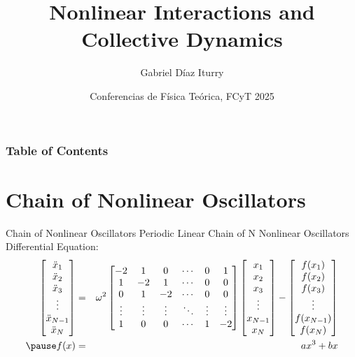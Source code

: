 \documentclass[aspectratio=169]{beamer}
\title{Nonlinear Interactions and Collective Dynamics}
\author{Gabriel D\'iaz Iturry}
\date{Conferencias de F\'isica Te\'orica, FCyT 2025}
\begin{document}
\maketitle

\begin{frame}
\frametitle{Table of Contents}
\tableofcontents
\end{frame}


\section{Chain of Nonlinear Oscillators}

\begin{frame}{Chain of Nonlinear Oscillators}
    Periodic Linear Chain of N Nonlinear Oscillators Differential Equation:
    \begin{eqnarray}
        \begin{bmatrix}
            \ddot x_1 \\ \ddot x_2 \\ \ddot x_3 \\ \vdots \\ \ddot x_{N-1}  \\ \ddot x_N 
        \end{bmatrix}   & = & 
        \omega^2
        \begin{bmatrix}
            -2 & 1 & 0 & \cdots & 0 & 1\\
            1 & -2 & 1 & \cdots & 0 & 0\\  
            0 & 1 & -2 & \cdots & 0 & 0\\      
            \vdots & \vdots & \vdots & \ddots & \vdots & \vdots \\
            1 & 0 & 0 & \cdots & 1 & -2
        \end{bmatrix}
        \begin{bmatrix}
            x_1 \\  x_2 \\  x_3 \\ \vdots \\ x_{N-1} \\  x_N 
        \end{bmatrix} 
        -
        \begin{bmatrix}
            f(x_1) \\ f(x_2) \\ f(x_3) \\ \vdots \\ f(x_{N-1}) \\ f(x_N) 
        \end{bmatrix} \\
        \pause
        f(x) & = & ax^3 + bx
    \end{eqnarray}
\end{frame}
\end{document}
